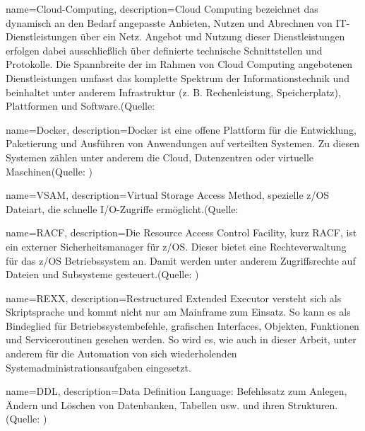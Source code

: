 {
	name=Cloud-Computing,
	description={\glqq Cloud Computing bezeichnet das dynamisch an den Bedarf angepasste Anbieten, Nutzen und Abrechnen von IT-Dienstleistungen über ein Netz. Angebot und Nutzung dieser Dienstleistungen erfolgen dabei ausschließlich über definierte technische Schnittstellen und Protokolle. Die Spannbreite der im Rahmen von Cloud Computing angebotenen Dienstleistungen umfasst das komplette Spektrum der Informationstechnik und beinhaltet unter anderem Infrastruktur (z. B. Rechenleistung, Speicherplatz), Plattformen und Software.\grqq(Quelle: \cite{.23.2.2020b}}
}

{
	name=Docker,
	description={Docker ist eine offene Plattform für die Entwicklung, Paketierung und Ausführen von Anwendungen auf verteilten Systemen. Zu diesen Systemen zählen unter anderem die Cloud, Datenzentren oder virtuelle Maschinen(Quelle: \cite{Vohra.2016})}
}

{
	name=VSAM,
	description={Virtual Storage Access Method, spezielle z/OS Dateiart, die schnelle I/O-Zugriffe ermöglicht.(Quelle: \cite[S. 2-4]{Lovelace.2013}}
}

{
	name=RACF,
	description={Die Resource Access Control Facility, kurz RACF, ist ein externer Sicherheitsmanager für z/OS.
Dieser bietet eine Rechteverwaltung für das z/OS Betriebssystem an.
Damit werden unter anderem Zugriffsrechte auf Dateien und Subsysteme gesteuert.(Quelle: \cite[S. 18-21]{Karan.2008})}
}

{
	name=REXX,
	description={Restructured Extended Executor versteht sich als Skriptsprache und kommt nicht nur am Mainframe zum Einsatz.
So kann es als Bindeglied für Betriebssystembefehle, grafischen Interfaces, Objekten, Funktionen und Serviceroutinen gesehen werden.
So wird es, wie auch in dieser Arbeit, unter anderem für die Automation von sich wiederholenden Systemadministrationsaufgaben eingesetzt.
\cite{Fosdick.2005}}
}

{
	name=DDL,
	description={Data Definition Language: Befehlssatz zum Anlegen, Ändern und Löschen von
Datenbanken, Tabellen usw. und ihren Strukturen.(Quelle: \cite[S. 61]{Adams.2016})}
}